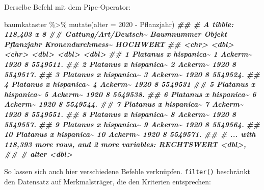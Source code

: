 \documentclass[11pt,german,a4paper]{article}
\newenvironment{Shaded}{\begin{snugshade}}{\end{snugshade}}
\newcommand{\AttributeTok}[1]{\textcolor[rgb]{0.77,0.63,0.00}{#1}}
\newcommand{\DecValTok}[1]{\textcolor[rgb]{0.00,0.00,0.81}{#1}}
\newcommand{\DocumentationTok}[1]{\textcolor[rgb]{0.56,0.35,0.01}{\textbf{\textit{#1}}}}
\newcommand{\FunctionTok}[1]{\textcolor[rgb]{0.00,0.00,0.00}{#1}}
\newcommand{\NormalTok}[1]{#1}
\newcommand{\SpecialCharTok}[1]{\textcolor[rgb]{0.00,0.00,0.00}{#1}}
\begin{document}
Derselbe Befehl mit dem Pipe-Operator:

\begin{Shaded}
\begin{Highlighting}[]
\NormalTok{baumkataster }\SpecialCharTok{\%\textgreater{}\%}
  \FunctionTok{mutate}\NormalTok{(}\AttributeTok{alter =} \DecValTok{2020} \SpecialCharTok{{-}}\NormalTok{ Pflanzjahr)}
\DocumentationTok{\#\# \# A tibble: 118,403 x 8}
\DocumentationTok{\#\#    \textasciigrave{}Gattung/Art/Deutsch\textasciitilde{} Baumnummer Objekt  Pflanzjahr Kronendurchmess\textasciitilde{} HOCHWERT}
\DocumentationTok{\#\#    \textless{}chr\textgreater{}                      \textless{}dbl\textgreater{} \textless{}chr\textgreater{}        \textless{}dbl\textgreater{}            \textless{}dbl\textgreater{}    \textless{}dbl\textgreater{}}
\DocumentationTok{\#\#  1 Platanus x hispanica\textasciitilde{}          1 Ackerm\textasciitilde{}       1920                8 5549511.}
\DocumentationTok{\#\#  2 Platanus x hispanica\textasciitilde{}          2 Ackerm\textasciitilde{}       1920                8 5549517.}
\DocumentationTok{\#\#  3 Platanus x hispanica\textasciitilde{}          3 Ackerm\textasciitilde{}       1920                8 5549524.}
\DocumentationTok{\#\#  4 Platanus x hispanica\textasciitilde{}          4 Ackerm\textasciitilde{}       1920                8 5549531 }
\DocumentationTok{\#\#  5 Platanus x hispanica\textasciitilde{}          5 Ackerm\textasciitilde{}       1920                8 5549538.}
\DocumentationTok{\#\#  6 Platanus x hispanica\textasciitilde{}          6 Ackerm\textasciitilde{}       1920                8 5549544.}
\DocumentationTok{\#\#  7 Platanus x hispanica\textasciitilde{}          7 Ackerm\textasciitilde{}       1920                8 5549551.}
\DocumentationTok{\#\#  8 Platanus x hispanica\textasciitilde{}          8 Ackerm\textasciitilde{}       1920                8 5549557.}
\DocumentationTok{\#\#  9 Platanus x hispanica\textasciitilde{}          9 Ackerm\textasciitilde{}       1920                8 5549564.}
\DocumentationTok{\#\# 10 Platanus x hispanica\textasciitilde{}         10 Ackerm\textasciitilde{}       1920                8 5549571.}
\DocumentationTok{\#\# \# ... with 118,393 more rows, and 2 more variables: RECHTSWERT \textless{}dbl\textgreater{},}
\DocumentationTok{\#\# \#   alter \textless{}dbl\textgreater{}}
\end{Highlighting}
\end{Shaded}

So lassen sich auch hier verschiedene Befehle verknüpfen. \texttt{filter()} beschränkt den Datensatz auf Merkmalsträger, die den Kriterien entsprechen:
\end{document}
